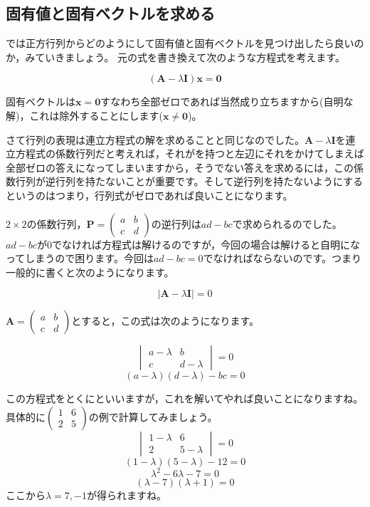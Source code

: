 \documentclass{ltjsbook}
\begin{document}
\subsection{固有値と固有ベクトルを求める}
では正方行列からどのようにして固有値と固有ベクトルを見つけ出したら良いのか，みていきましょう。
元の式を書き換えて次のような方程式を考えます。

\[ (\bm{A} - \lambda\bm{I})\bm{x} = \bm{0} \]

固有ベクトルは$\bm{x}=\bm{0}$すなわち全部ゼロであれば当然成り立ちますから(自明な解)，これは除外することにします($\bm{x}\neq \bm{0}$)。

さて行列の表現は連立方程式の解を求めることと同じなのでした。$\bm{A} - \lambda\bm{I}$を連立方程式の係数行列だと考えれば，それがを持つと左辺にそれをかけてしまえば全部ゼロの答えになってしまいますから，そうでない答えを求めるには，この係数行列が逆行列を持たないことが重要です。そして逆行列を持たないようにするというのはつまり，行列式がゼロであれば良いことになります。

$2 \times 2$の係数行列，$\bm{P}=\begin{pmatrix} a&b\\c&d \end{pmatrix}$の逆行列は$ad-bc$で求められるのでした。
$ad-bc$が0でなければ方程式は解けるのですが，今回の場合は解けると自明になってしまうので困ります。今回は$ad-bc=0$でなければならないのです。つまり一般的に書くと次のようになります。

\[ | \bm{A} - \lambda \bm{I} | = 0 \]

$\bm{A} = \begin{pmatrix} a & b \\ c & d \end{pmatrix} $とすると，この式は次のようになります。

\[   \begin{vmatrix} a-\lambda & b \\ c & d - \lambda \end{vmatrix} = 0 \]
\[ (a-\lambda)(d-\lambda) - bc = 0 \]

この方程式をとくにといいますが，これを解いてやれば良いことになりますね。具体的に$\begin{pmatrix}1&6\\2&5\end{pmatrix}$の例で計算してみましょう。
\[ \begin{vmatrix}1-\lambda & 6 \\ 2 & 5-\lambda\end{vmatrix}=0\]
\[ (1-\lambda)(5-\lambda) - 12 = 0 \]
\[ \lambda^2 - 6\lambda -7 = 0 \]
\[ (\lambda-7)(\lambda+1)=0\]
ここから$\lambda=7,-1$が得られますね。
\end{document}
